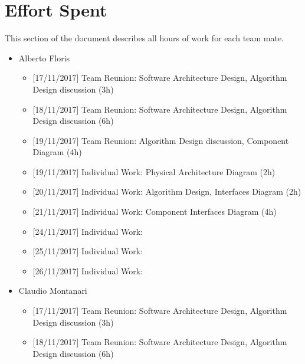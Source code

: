 \chapter{Effort Spent}

This section of the document describes all hours of work for each team mate.

\begin{itemize}
    
    \item Alberto Floris
        \begin{itemize}
            \item {[}17/11/2017{]} Team Reunion: Software Architecture Design, Algorithm Design discussion (3h)
            
            \item  {[}18/11/2017{]} Team Reunion: Software Architecture Design, Algorithm Design discussion (6h)
            
            \item {[}19/11/2017{]} Team Reunion: Algorithm Design discussion, Component Diagram (4h)
            
            \item {[}19/11/2017{]} Individual Work: Physical Architecture Diagram (2h)
            
            \item {[}20/11/2017{]} Individual Work: Algorithm Design,  Interfaces Diagram (2h)
            
            \item {[}21/11/2017{]} Individual Work: Component Interfaces Diagram (4h)
            
            \item {[}24/11/2017{]} Individual Work:           

            \item {[}25/11/2017{]} Individual Work:
            
            \item {[}26/11/2017{]} Individual Work:
            
        \end{itemize}

    \item Claudio Montanari
        \begin{itemize}
            \item {[}17/11/2017{]} Team Reunion: Software Architecture Design, Algorithm Design discussion (3h)
            
            \item {[}18/11/2017{]} Team Reunion: Software Architecture Design, Algorithm Design discussion (6h)
            

\end{itemize}
\end{itemize}

